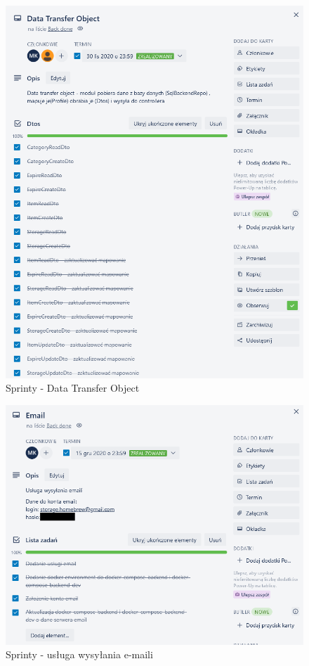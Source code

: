 \documentclass[12pt,a4paper]{article}
\begin{document}
				\begin{figure}[H]
			\centering
			\includegraphics[width=\textwidth]{img/DTO_Sprint.png}
			\caption{Sprinty - Data Transfer Object}
			\label{fig:sprint-dto}
		\end{figure}
				\begin{figure}[H]
			\centering
			\includegraphics[width=\textwidth]{img/Email_sprint.png}
			\caption{Sprinty - usługa wysyłania e-maili}
			\label{fig:sprint-email}
		\end{figure}
	\newpage
	
\end{document}
